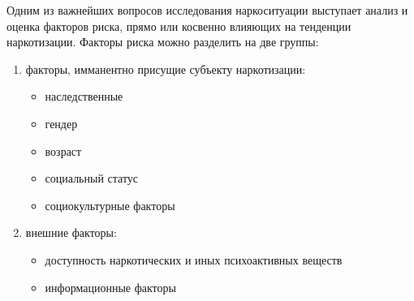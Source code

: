 \documentclass[a4paper,14pt]{article}
\begin{document}
Одним из важнейших вопросов исследования наркоситуации выступает анализ и
оценка факторов риска, прямо или косвенно влияющих на тенденции наркотизации. 
Факторы риска можно разделить на две группы:
\begin{enumerate}
    \item факторы, имманентно присущие субъекту наркотизации:
        \begin{itemize}
            \item наследственные
            \item гендер
            \item возраст
            \item социальный статус
            \item социокультурные факторы
        \end{itemize}
    \item внешние факторы:
        \begin{itemize}
            \item доступность наркотических и иных психоактивных веществ
            \item информационные факторы	
        \end{itemize}
\end{enumerate}	
\end{document}
